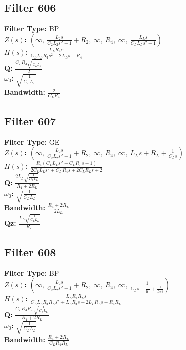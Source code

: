 \documentclass{article}
\begin{document}
\subsection*{Filter 606}
\textbf{Filter Type:} BP \\ 
\textbf{$Z(s)$:} $\left( \infty, \  \frac{L_{2} s}{C_{2} L_{2} s^{2} + 1} + R_{2}, \  \infty, \  R_{4}, \  \infty, \  \frac{L_{L} s}{C_{L} L_{L} s^{2} + 1}\right)$ \\ 
\textbf{$H(s)$:} $\frac{L_{L} R_{4} s}{C_{L} L_{L} R_{4} s^{2} + 2 L_{L} s + R_{4}}$ \\ 
\textbf{Q:} $\frac{C_{L} R_{4} \sqrt{\frac{1}{C_{L} L_{L}}}}{2}$ \\ 
\textbf{$\omega_0$:} $\sqrt{\frac{1}{C_{L} L_{L}}}$ \\ 
\textbf{Bandwidth:} $\frac{2}{C_{L} R_{4}}$ \\ 
\subsection*{Filter 607}
\textbf{Filter Type:} GE \\ 
\textbf{$Z(s)$:} $\left( \infty, \  \frac{L_{2} s}{C_{2} L_{2} s^{2} + 1} + R_{2}, \  \infty, \  R_{4}, \  \infty, \  L_{L} s + R_{L} + \frac{1}{C_{L} s}\right)$ \\ 
\textbf{$H(s)$:} $\frac{R_{4} \left(C_{L} L_{L} s^{2} + C_{L} R_{L} s + 1\right)}{2 C_{L} L_{L} s^{2} + C_{L} R_{4} s + 2 C_{L} R_{L} s + 2}$ \\ 
\textbf{Q:} $\frac{2 L_{L} \sqrt{\frac{1}{C_{L} L_{L}}}}{R_{4} + 2 R_{L}}$ \\ 
\textbf{$\omega_0$:} $\sqrt{\frac{1}{C_{L} L_{L}}}$ \\ 
\textbf{Bandwidth:} $\frac{R_{4} + 2 R_{L}}{2 L_{L}}$ \\ 
\textbf{Qz:} $\frac{L_{L} \sqrt{\frac{1}{C_{L} L_{L}}}}{R_{L}}$ \\ 
\subsection*{Filter 608}
\textbf{Filter Type:} BP \\ 
\textbf{$Z(s)$:} $\left( \infty, \  \frac{L_{2} s}{C_{2} L_{2} s^{2} + 1} + R_{2}, \  \infty, \  R_{4}, \  \infty, \  \frac{1}{C_{L} s + \frac{1}{R_{L}} + \frac{1}{L_{L} s}}\right)$ \\ 
\textbf{$H(s)$:} $\frac{L_{L} R_{4} R_{L} s}{C_{L} L_{L} R_{4} R_{L} s^{2} + L_{L} R_{4} s + 2 L_{L} R_{L} s + R_{4} R_{L}}$ \\ 
\textbf{Q:} $\frac{C_{L} R_{4} R_{L} \sqrt{\frac{1}{C_{L} L_{L}}}}{R_{4} + 2 R_{L}}$ \\ 
\textbf{$\omega_0$:} $\sqrt{\frac{1}{C_{L} L_{L}}}$ \\ 
\textbf{Bandwidth:} $\frac{R_{4} + 2 R_{L}}{C_{L} R_{4} R_{L}}$ \\ 
\end{document}
